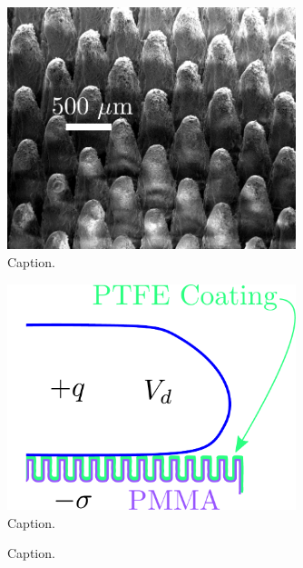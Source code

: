 \documentclass[10pt,a4paper]{article}
\begin{document}
\begin{figure}[ht]
 \centering
 \includegraphics[width=0.75\textwidth]{../figures/SEM.pdf}
 \caption{Caption.\label{fig:SEM}}
\end{figure}

\begin{figure}[ht]
 \centering
 \includegraphics[width=0.75\textwidth]{../figures/schematic.pdf}
 \caption{Caption.\label{fig:schematic}}
\end{figure}

\begin{figure}
    \centering
    \def\svgwidth{\columnwidth}
    
    \caption{Caption.\label{fig:rig}}
\end{figure}
\end{document}
